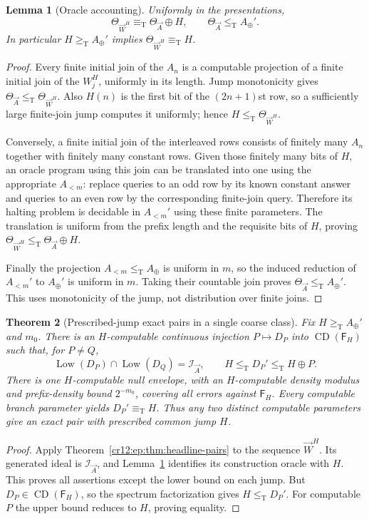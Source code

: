 \documentclass[11pt,letterpaper]{article}
\theoremstyle{plain}
\newtheorem{theorem}{Theorem}[section]
\newtheorem{lemma}[theorem]{Lemma}
\theoremstyle{definition}
\theoremstyle{remark}
\numberwithin{equation}{section}
\newcommand{\leT}{\leq_{\mathrm T}}
\newcommand{\geT}{\geq_{\mathrm T}}
\newcommand{\eqT}{\equiv_{\mathrm T}}
\newcommand{\CD}{\operatorname{CD}}
\newcommand{\Low}{\operatorname{Low}}
\newcommand{\I}{\mathcal I}
\newcommand{\Aplus}{A_{\oplus}}          %
\newcommand{\Alt}[1]{A_{<#1}}            %
\newcommand{\Fint}{\mathsf F}            %
\newcommand{\WW}{\vec W}                 %
\begin{document}
\begin{lemma}[Oracle accounting]\label{cr12:ep:lem:oracle-account}
Uniformly in the presentations,
\begin{equation}\label{cr12:ep:eq:H-account}
 \Theta_{\WW^H}\eqT \Theta_{\vec A}\oplus H,
 \qquad \Theta_{\vec A}\leT \Aplus'.
\end{equation}
In particular $H\geT \Aplus'$ implies $\Theta_{\WW^H}\eqT H$.
\end{lemma}
\begin{proof}
Every finite initial join of the $A_n$ is a computable projection of a finite initial
join of the $W^H_j$, uniformly in its length. Jump monotonicity gives
$\Theta_{\vec A}\leT \Theta_{\WW^H}$. Also $H(n)$ is the first bit of the $(2n+1)$st
row, so a sufficiently large finite-join jump computes it uniformly; hence
$H\leT \Theta_{\WW^H}$.

Conversely, a finite initial join of the interleaved rows consists of finitely many
$A_n$ together with finitely many constant rows. Given those finitely many bits of
$H$, an oracle program using this join can be translated into one using the
appropriate $\Alt m$: replace queries to an odd row by its known constant answer and
queries to an even row by the corresponding finite-join query. Therefore its halting
problem is decidable in $\Alt m'$ using these finite parameters. The translation is
uniform from the prefix length and the requisite bits of $H$, proving
$\Theta_{\WW^H}\leT \Theta_{\vec A}\oplus H$.

Finally the projection $\Alt m\leT \Aplus$ is uniform in $m$, so the induced
reduction of $\Alt m'$ to $\Aplus'$ is uniform in $m$. Taking their countable join
proves $\Theta_{\vec A}\leT \Aplus'$. This uses monotonicity of the jump, not
distribution over finite joins.
\end{proof}

\begin{theorem}[Prescribed-jump exact pairs in a single coarse class]\label{cr12:ep:thm:prescribed-jump}
Fix $H\geT \Aplus'$ and $m_0$. There is an $H$-computable continuous injection
$P\mapsto D_P$ into $\CD(\Fint_H)$ such that, for $P\ne Q$,
\begin{equation}\label{cr12:ep:eq:prescribed-pair}
 \Low(D_P)\cap\Low(D_Q)=\I_{\vec A},\qquad
 H\leT D_P'\leT H\oplus P.
\end{equation}
There is one $H$-computable null envelope, with an $H$-computable density modulus and
prefix-density bound $2^{-m_0}$, covering all errors against $\Fint_H$. Every
computable branch parameter yields $D_P'\eqT H$. Thus any two distinct computable
parameters give an exact pair with prescribed common jump $H$.
\end{theorem}
\begin{proof}
Apply Theorem~\ref{cr12:ep:thm:headline-pairs} to the sequence $\WW^H$. Its generated
ideal is $\I_{\vec A}$, and Lemma~\ref{cr12:ep:lem:oracle-account} identifies its
construction oracle with $H$. This proves all assertions except the lower bound on
each jump. But $D_P\in\CD(\Fint_H)$, so the spectrum factorization gives
$H\leT D_P'$. For computable $P$ the upper bound reduces to $H$, proving equality.
\end{proof}
\end{document}
